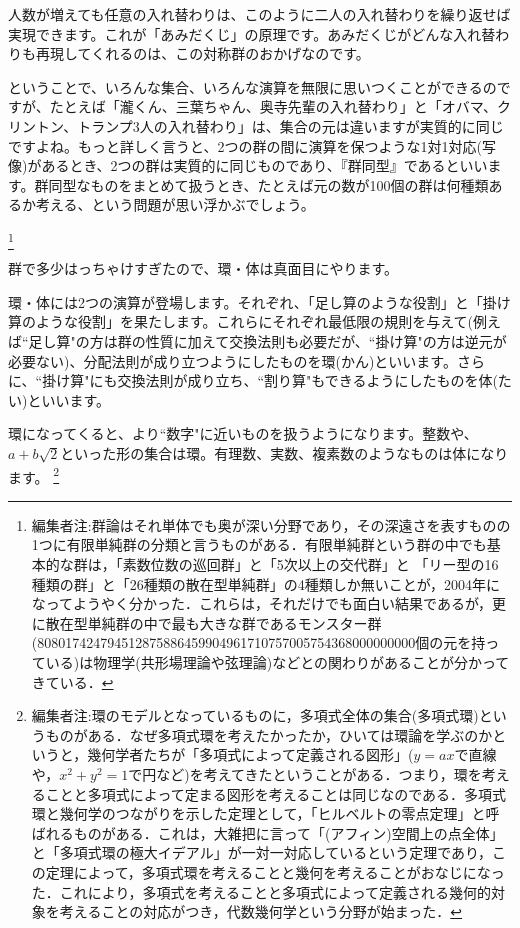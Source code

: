人数が増えても任意の入れ替わりは、このように二人の入れ替わりを繰り返せば実現できます。これが「あみだくじ」の原理です。あみだくじがどんな入れ替わりも再現してくれるのは、この対称群のおかげなのです。

ということで、いろんな集合、いろんな演算を無限に思いつくことができるのですが、たとえば「瀧くん、三葉ちゃん、奥寺先輩の入れ替わり」と「オバマ、クリントン、トランプ3人の入れ替わり」は、集合の元は違いますが実質的に同じですよね。もっと詳しく言うと、2つの群の間に演算を保つような1対1対応(写像)があるとき、2つの群は実質的に同じものであり、『群同型』であるといいます。群同型なものをまとめて扱うとき、たとえば元の数が100個の群は何種類あるか考える、という問題が思い浮かぶでしょう。

\footnote{編集者注:群論はそれ単体でも奥が深い分野であり，その深遠さを表すものの1つに有限単純群の分類と言うものがある．有限単純群という群の中でも基本的な群は，「素数位数の巡回群」と「5次以上の交代群」と
「リー型の16種類の群」と「26種類の散在型単純群」の4種類しか無いことが，2004年になってようやく分かった．これらは，それだけでも面白い結果であるが，更に散在型単純群の中で最も大きな群であるモンスター群(808017424794512875886459904961710757005754368000000000個の元を持っている)は物理学(共形場理論や弦理論)などとの関わりがあることが分かってきている．}

群で多少はっちゃけすぎたので、環・体は真面目にやります。

環・体には2つの演算が登場します。それぞれ、「足し算のような役割」と「掛け算のような役割」を果たします。これらにそれぞれ最低限の規則を与えて(例えば``足し算"の方は群の性質に加えて交換法則も必要だが、``掛け算"の方は逆元が必要ない)、分配法則が成り立つようにしたものを環(かん)といいます。さらに、``掛け算"にも交換法則が成り立ち、``割り算"もできるようにしたものを体(たい)といいます。

環になってくると、より``数字"に近いものを扱うようになります。整数や、$a + b\sqrt{2}$といった形の集合は環。有理数、実数、複素数のようなものは体になります。
\footnote{編集者注:環のモデルとなっているものに，多項式全体の集合(多項式環)というものがある．なぜ多項式環を考えたかったか，ひいては環論を学ぶのかというと，幾何学者たちが「多項式によって定義される図形」($y=ax$で直線や，$x^2+y^2=1$で円など)を考えてきたということがある．つまり，環を考えることと多項式によって定まる図形を考えることは同じなのである．多項式環と幾何学のつながりを示した定理として，「ヒルベルトの零点定理」と呼ばれるものがある．これは，大雑把に言って「(アフィン)空間上の点全体」と「多項式環の極大イデアル」が一対一対応しているという定理であり，この定理によって，多項式環を考えることと幾何を考えることがおなじになった．これにより，多項式を考えることと多項式によって定義される幾何的対象を考えることの対応がつき，代数幾何学という分野が始まった．}


